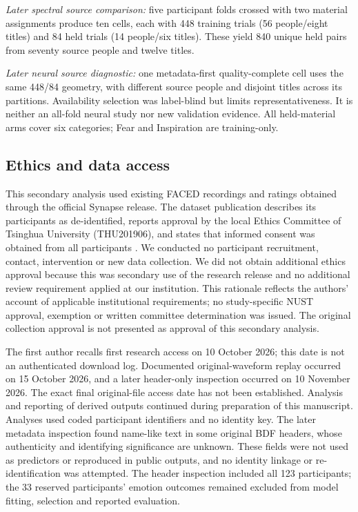 \documentclass[10pt,letterpaper]{article}
\begin{document}
\textit{Later spectral source comparison:} five participant folds crossed with two material assignments produce ten cells, each with 448 training trials (56 people/eight titles) and 84 held trials (14 people/six titles). These yield 840 unique held pairs from seventy source people and twelve titles.

\textit{Later neural source diagnostic:} one metadata-first quality-complete cell uses the same 448/84 geometry, with different source people and disjoint titles across its partitions. Availability selection was label-blind but limits representativeness. It is neither an all-fold neural study nor new validation evidence. All held-material arms cover six categories; Fear and Inspiration are training-only.

\subsection{Ethics and data access}
This secondary analysis used existing FACED recordings and ratings obtained through the official Synapse release. The dataset publication describes its participants as de-identified, reports approval by the local Ethics Committee of Tsinghua University (THU201906), and states that informed consent was obtained from all participants \cite{chen2023faced}. We conducted no participant recruitment, contact, intervention or new data collection. We did not obtain additional ethics approval because this was secondary use of the research release and no additional review requirement applied at our institution. This rationale reflects the authors' account of applicable institutional requirements; no study-specific NUST approval, exemption or written committee determination was issued. The original collection approval is not presented as approval of this secondary analysis.

The first author recalls first research access on 10 October 2026; this date is not an authenticated download log. Documented original-waveform replay occurred on 15 October 2026, and a later header-only inspection occurred on 10 November 2026. The exact final original-file access date has not been established. Analysis and reporting of derived outputs continued during preparation of this manuscript. Analyses used coded participant identifiers and no identity key. The later metadata inspection found name-like text in some original BDF headers, whose authenticity and identifying significance are unknown. These fields were not used as predictors or reproduced in public outputs, and no identity linkage or re-identification was attempted. The header inspection included all 123 participants; the 33 reserved participants' emotion outcomes remained excluded from model fitting, selection and reported evaluation.
\end{document}
